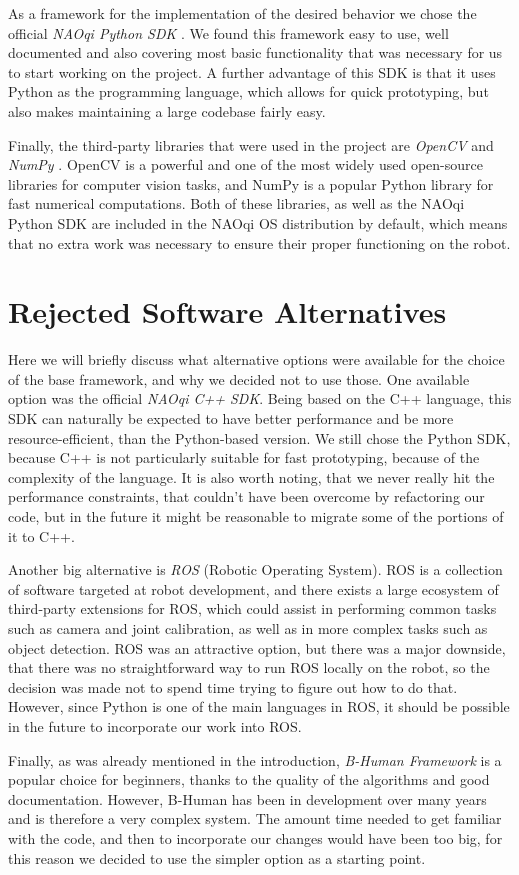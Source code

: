 As a framework for the implementation of the desired behavior we chose the
official \textit{NAOqi Python SDK} \cite{naoqi-sdk}. We found this framework
easy to use, well documented and also covering most basic functionality that
was necessary for us to start working on the project. A further advantage of
this SDK is that it uses Python as the programming language, which allows for
quick prototyping, but also makes maintaining a large codebase fairly easy.

Finally, the third-party libraries that were used in the project are
\textit{OpenCV} and \textit{NumPy} \cite{opencv, numpy}. OpenCV is a powerful
and one of the most widely used open-source libraries for computer vision
tasks, and NumPy is a popular Python library for fast numerical computations.
Both of these libraries, as well as the NAOqi Python SDK are included in the
NAOqi OS distribution by default, which means that no extra work was necessary
to ensure their proper functioning on the robot.

\section{Rejected Software Alternatives}

Here we will briefly discuss what alternative options were available for the
choice of the base framework, and why we decided not to use those. One
available option was the official \textit{NAOqi C++ SDK}. Being based on the
C++ language, this SDK can naturally be expected to have better performance and
be more resource-efficient, than the Python-based version. We still chose the
Python SDK, because C++ is not particularly suitable for fast prototyping,
because of the complexity of the language. It is also worth noting, that we
never really hit the performance constraints, that couldn't have been overcome
by refactoring our code, but in the future it might be reasonable to migrate
some of the portions of it to C++.

Another big alternative is \textit{ROS} \cite{ros} (Robotic Operating System).
ROS is a collection of software targeted at robot development, and there exists
a large ecosystem of third-party extensions for ROS, which could assist in
performing common tasks such as camera and joint calibration, as well as in
more complex tasks such as object detection. ROS was an attractive option, but
there was a major downside, that there was no straightforward way to run ROS
locally on the robot, so the decision was made not to spend time trying to
figure out how to do that. However, since Python is one of the main languages
in ROS, it should be possible in the future to incorporate our work into ROS.

Finally, as was already mentioned in the introduction, \textit{B-Human
  Framework} is a popular choice for beginners, thanks to the quality of the
algorithms and good documentation. However, B-Human has been in development
over many years and is therefore a very complex system. The amount time needed
to get familiar with the code, and then to incorporate our changes would have
been too big, for this reason we decided to use the simpler option as a
starting point.
